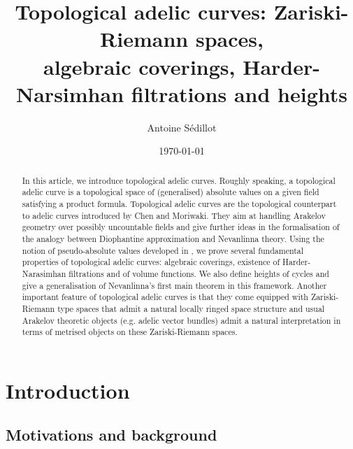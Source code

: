 \documentclass [11pt,reqno]{amsart}
\newcommand{\1}{\mathmybb{1}}
\begin{document}
\title[Topological adelic curves]{Topological adelic curves: Zariski-Riemann spaces, \\ 
algebraic coverings, Harder-Narsimhan filtrations and heights}
\date{\today}
\author{Antoine Sédillot}
\address{A. Sédillot, Mathematik, Universit{\"a}t 
		Regensburg, 93040 Regensburg, Germany}

\begin{abstract}
In this article, we introduce topological adelic curves. Roughly speaking, a topological adelic curve is a topological space of (generalised) absolute values on a given field satisfying a product formula. Topological adelic curves are the topological counterpart to adelic curves introduced by Chen and Moriwaki. They aim at handling Arakelov geometry over possibly uncountable fields and give further ideas in the formalisation of the analogy between Diophantine approximation and Nevanlinna theory. Using the notion of pseudo-absolute values developed in \cite{Sedillot_pav}, we prove several fundamental properties of topological adelic curves: algebraic coverings, existence of Harder-Narasimhan filtrations and of volume functions. We also define heights of cycles and give a generalisation of Nevanlinna's first main theorem in this framework. Another important feature of topological adelic curves is that they come equipped with Zariski-Riemann type spaces that admit a natural locally ringed space structure and usual Arakelov theoretic objects (e.g. adelic vector bundles) admit a natural interpretation in terms of metrised objects on these Zariski-Riemann spaces. 
\end{abstract}


\maketitle

\tableofcontents

\section*{Introduction}

\subsection*{Motivations and background}
\end{document}

